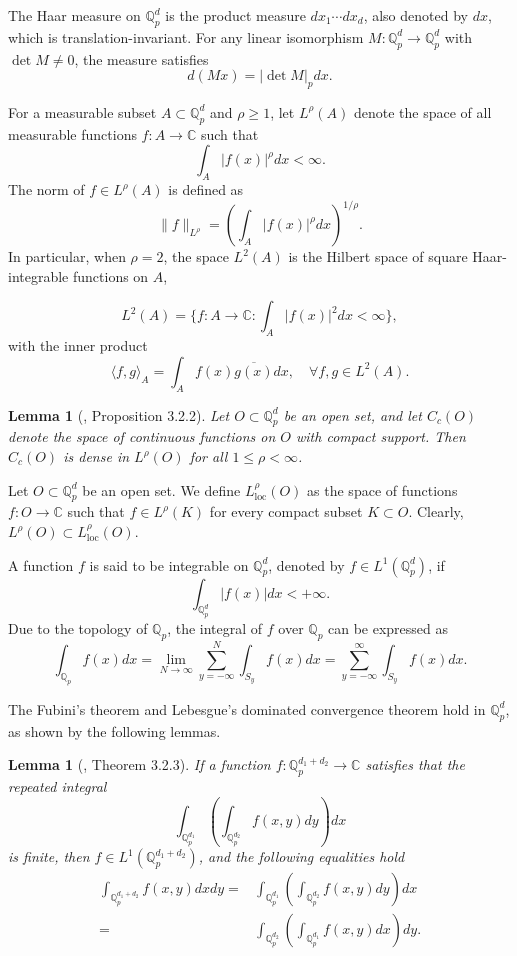 \documentclass[a4paper,12pt]{amsart}
\newtheorem{lemma}[theorem]{Lemma}
\def\Qp{\mathbb{Q}_p}
\newcommand{\abs}[1]{|#1|}
\newcommand{\abspp}[1]{|#1|_p}
\newcommand{\norm}[1]{\|#1\|}
\begin{document}
The Haar measure on \(\Qp^d\) is the product measure \(dx_1 \cdots dx_d\), also denoted by \(dx\),
which is translation-invariant. For any linear isomorphism \(M: \Qp^d \to \Qp^d\) with \(\det M \neq 0\),
the measure satisfies
\[
 d(Mx) = \abspp{\det M} dx.
\]

For a measurable subset \(A \subset \Qp^d\) and \(\rho \geq 1\), let \(L^\rho(A)\) denote the space of
all measurable functions \(f: A \to \mathbb{C}\) such that
\[
\int_A \abs{f(x)}^\rho dx < \infty.
\]
The norm of \(f \in L^\rho(A)\) is defined as
\[
\norm{f}_{L^\rho} = \left(\int_A \abs{f(x)}^\rho dx\right)^{1/\rho}.
\]
In particular, when \(\rho = 2\), the space $L^2(A)$ is the Hilbert space of square Haar-integrable functions on $A$,

$$
L^2(A) =\Big\{f: A\rightarrow\mathbb{C}: \int_{A}|f(x)|^2dx<\infty \Big\},
$$
with the inner product
$$
\langle f, g\rangle_{A}=\int_{A} f(x)\overline{g(x)}dx, \quad \forall f, g \in L^2(A).
$$

\begin{lemma}[{\cite{AKS}, Proposition 3.2.2}]\label{dense}
 Let \(O \subset \Qp^d\) be an open set, and let \(C_c(O)\) denote the space of continuous functions on \(O\) with compact support. Then \(C_c(O)\) is dense in \(L^\rho(O)\) for all \(1 \leq \rho < \infty\).
\end{lemma}
Let \(O \subset \Qp^d\) be an open set. We define \(L_{\text{loc}}^\rho(O)\) as the space of functions \(f: O \to \mathbb{C}\) such that \(f \in L^\rho(K)\) for every compact subset \(K \subset O\). Clearly, \(L^\rho(O) \subset L_{\text{loc}}^\rho(O)\).

A function \(f\) is said to be integrable on \(\Qp^d\), denoted by \(f \in L^1(\Qp^d)\), if
\[
\int_{\Qp^d} |f(x)| dx<+\infty.
\]
Due to the topology of \(\Qp\), the integral of \(f\) over \(\Qp\) can be expressed as
\[
\int_{\Qp} f(x) dx = \lim_{N \to \infty} \sum_{y=-\infty}^N \int_{S_y} f(x) dx = \sum_{y=-\infty}^\infty \int_{S_y} f(x) dx.
\]

The Fubini's theorem and Lebesgue's dominated convergence theorem hold in \(\Qp^d\), as shown by the following lemmas.


 \begin{lemma}[{\cite{AKS}, Theorem 3.2.3}]\label{fubini}
 If a function \(f: \mathbb{Q}_p^{d_1 + d_2} \to \mathbb{C}\) satisfies that the repeated integral
\[
\int_{\mathbb{Q}_p^{d_1}} \left(\int_{\mathbb{Q}_p^{d_2}} f(x, y) dy\right) dx
\]
is finite, then \(f \in L^1(\mathbb{Q}_p^{d_1 + d_2})\), and the following equalities hold
\[\begin{split}
\int_{\mathbb{Q}_p^{d_1 + d_2}} f(x, y) dx dy
=&\int_{\mathbb{Q}_p^{d_1}} \left(\int_{\mathbb{Q}_p^{d_2}} f(x, y) dy\right) dx\\
=&\int_{\mathbb{Q}_p^{d_2}} \left(\int_{\mathbb{Q}_p^{d_1}} f(x, y) dx\right) dy.
\end{split}
\]

 \end{lemma}
\end{document}
